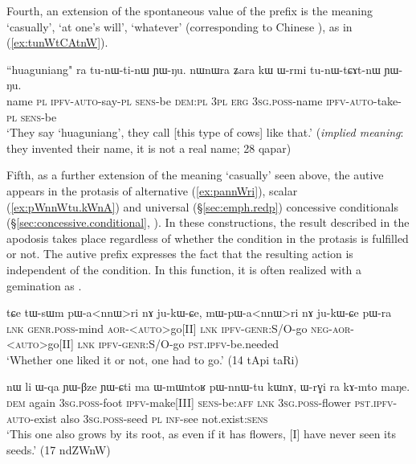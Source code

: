 Fourth, an extension of the spontaneous value of the prefix  is the meaning `casually', `at one's will', `whatever' (corresponding to Chinese ), as in (\ref{ex:tunWtCAtnW}). 

\begin{exe}
\ex \label{ex:tunWtCAtnW}
\gll ``huaguniang" ra tu-nɯ-ti-nɯ ɲɯ-ŋu. nɯnɯra ʑara kɯ ɯ-rmi tu-nɯ-tɕɤt-nɯ ɲɯ-ŋu.  \\
name \textsc{pl}	\textsc{ipfv}-\textsc{auto}-say-\textsc{pl}	\textsc{sens}-be	\textsc{dem}:\textsc{pl}	\textsc{3pl}	\textsc{erg}	\textsc{3sg}.\textsc{poss}-name	\textsc{ipfv}-\textsc{auto}-take-\textsc{pl}	\textsc{sens}-be\\
\glt `They say `huaguniang', they call [this type of cows] like that.' (\textit{implied meaning}: they invented their name, it is not a real name; 28 qapar) 
\end{exe}

Fifth, as a further extension of the meaning `casually' seen above, the autive appears in the protasis of alternative (\ref{ex:pannWri}), scalar (\ref{ex:pWnnWtu.kWnA}) and universal (§\ref{sec:emph.redp}) concessive conditionals (§\ref{sec:concessive.conditional}, \citealt[298--300]{jacques14linking}). In these constructions, the result described in the apodosis takes place regardless of whether the condition in the protasis is fulfilled or not. The autive prefix expresses the fact that the resulting action is independent of the condition. In this function, it is often realized with a gemination as .

\begin{exe}
\ex  \label{ex:pannWri}
\gll tɕe tɯ-sɯm pɯ-a<nnɯ>ri nɤ ju-kɯ-ɕe, mɯ-pɯ-a<nnɯ>ri nɤ ju-kɯ-ɕe pɯ-ra \\
\textsc{lnk} \textsc{genr}.\textsc{poss}-mind  \textsc{aor}-<\textsc{auto}>go[II] \textsc{lnk} \textsc{ipfv}-\textsc{genr}:S/O-go \textsc{neg}-\textsc{aor}-<\textsc{auto}>go[II] \textsc{lnk} \textsc{ipfv}-\textsc{genr}:S/O-go \textsc{pst}.\textsc{ipfv}-be.needed \\
\glt `Whether one liked it or not, one had to go.' (14 tApi taRi) 
\end{exe}

 \begin{exe}
\ex  \label{ex:pWnnWtu.kWnA}
\gll nɯ li ɯ-qa ɲɯ-βze ɲɯ-ɕti ma ɯ-mɯntoʁ pɯ-nnɯ-tu kɯnɤ, ɯ-rɣi ra kɤ-mto maŋe.  \\
\textsc{dem} again \textsc{3sg}.\textsc{poss}-foot \textsc{ipfv}-make[III] \textsc{sens}-be:\textsc{aff} \textsc{lnk} \textsc{3sg}.\textsc{poss}-flower \textsc{pst}.\textsc{ipfv}-\textsc{auto}-exist also \textsc{3sg}.\textsc{poss}-seed \textsc{pl} \textsc{inf}-see not.exist:\textsc{sens} \\
\glt `This one also grows by its root, as even if it has flowers, [I] have never seen its seeds.' (17 ndZWnW)
\end{exe}


